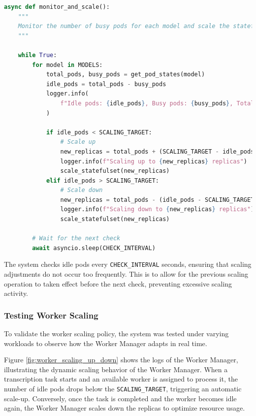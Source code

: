 \begin{lstlisting}[language=python, caption={Worker Scaling Policy}, label={lst:worker_scaling}]
async def monitor_and_scale():
    """
    Monitor the number of busy pods for each model and scale the statefulset up or down based on the number of idle pods.
    """

    while True:
        for model in MODELS:
            total_pods, busy_pods = get_pod_states(model)
            idle_pods = total_pods - busy_pods
            logger.info(
                f"Idle pods: {idle_pods}, Busy pods: {busy_pods}, Total pods: {total_pods}"
            )

            if idle_pods < SCALING_TARGET:
                # Scale up
                new_replicas = total_pods + (SCALING_TARGET - idle_pods)
                logger.info(f"Scaling up to {new_replicas} replicas")
                scale_statefulset(new_replicas)
            elif idle_pods > SCALING_TARGET:
                # Scale down
                new_replicas = total_pods - (idle_pods - SCALING_TARGET)
                logger.info(f"Scaling down to {new_replicas} replicas")
                scale_statefulset(new_replicas)

        # Wait for the next check
        await asyncio.sleep(CHECK_INTERVAL)
\end{lstlisting}

The system checks idle pods every \texttt{CHECK\_INTERVAL} seconds, ensuring that scaling adjustments do not occur too frequently. This is to allow for the previous scaling operation to taken effect before the next check, preventing excessive scaling activity.

\subsubsection{Testing Worker Scaling}
To validate the worker scaling policy, the system was tested under varying workloads to observe how the Worker Manager adapts in real time.

Figure \ref{fig:worker_scaling_up_down} shows the logs of the Worker Manager, illustrating the dynamic scaling behavior of the Worker Manager. When a transcription task starts and an available worker is assigned to process it, the number of idle pods drops below the \texttt{SCALING\_TARGET}, triggering an automatic scale-up. Conversely, once the task is completed and the worker becomes idle again, the Worker Manager scales down the replicas to optimize resource usage.

